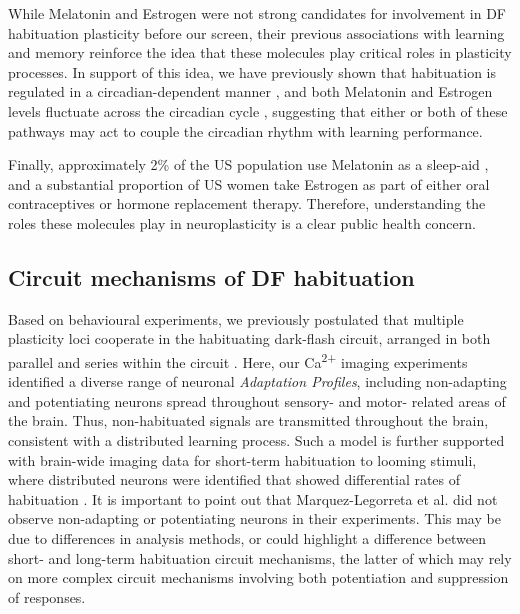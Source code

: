 \documentclass[9pt,lineno]{RandlettLab_elife}
\begin{document}
While Melatonin and Estrogen were not strong candidates for involvement in DF habituation plasticity before our screen, their previous associations with learning and memory reinforce the idea that these molecules play critical roles in plasticity processes. In support of this idea, we have previously shown that habituation is regulated in a circadian-dependent manner \citep{Randlett2019-fi}, and both Melatonin and Estrogen levels fluctuate across the circadian cycle \citep{Alvord2022-ii, Gandhi2015-vw, Zhdanova2001-tk}, suggesting that either or both of these pathways may act to couple the circadian rhythm with learning performance. 

Finally, approximately 2\% of the US population use Melatonin as a sleep-aid \citep{Li2022-lu}, and a substantial proportion of US women take Estrogen as part of either oral contraceptives or hormone replacement therapy. Therefore, understanding the roles these molecules play in neuroplasticity is a clear public health concern. 

\subsection{Circuit mechanisms of DF habituation}



Based on behavioural experiments, we previously postulated that multiple plasticity loci cooperate in the habituating dark-flash circuit, arranged in both parallel and series within the circuit \citep{Randlett2019-fi}. Here, our Ca\textsuperscript{2+} imaging experiments identified a diverse range of neuronal \emph{Adaptation Profiles}, including non-adapting and potentiating neurons spread throughout sensory- and motor- related areas of the brain. Thus, non-habituated signals are transmitted throughout the brain, consistent with a distributed learning process. Such a model is further supported with brain-wide imaging data for short-term habituation to looming stimuli, where distributed neurons were identified that showed differential rates of habituation \citep{Marquez-Legorreta2022-ih}. It is important to point out that Marquez-Legorreta et al. did not observe non-adapting or potentiating neurons in their experiments. This may be due to differences in analysis methods, or could highlight a difference between short- and long-term habituation circuit mechanisms, the latter of which may rely on more complex circuit mechanisms involving both potentiation and suppression of responses. 
\end{document}
